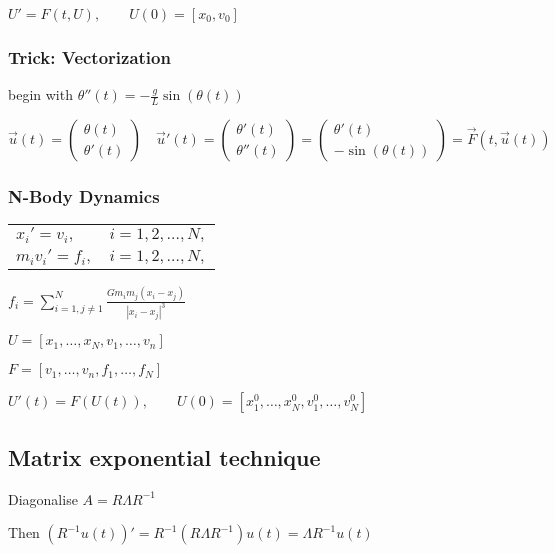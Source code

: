 \documentclass[10pt,a4paper]{scrartcl}
\begin{document}
\begin{multicols*}{3}
\begin{center}
$U'=F(t,U),\qquad U(0)=[x_0,v_0]$
\end{center}

\subsubsection{Trick: Vectorization}

begin with $\theta''(t)=-\frac{g}{L}\sin(\theta(t))$

\small
$\vec{u}(t)=\begin{pmatrix}\theta(t)\\\theta'(t)\end{pmatrix}\quad\vec{u}'(t)=\begin{pmatrix}\theta'(t)\\\theta''(t)\end{pmatrix}=\begin{pmatrix}\theta'(t)\\-\sin(\theta(t))\end{pmatrix}=\vec{F}(t,\vec{u}(t))$\normalsize

\subsubsection{N-Body Dynamics}

\begin{tabular}{ll}
$x_i'=v_i,$&$i=1,2,\ldots,N,$\\
$m_iv_i'=f_i,$&$i=1,2,\ldots,N,$
\end{tabular}

$f_i=\sum\limits_{i=1,j\neq 1}^N\frac{Gm_im_j(x_i-x_j)}{\left|x_i-x_j\right|^3}\qquad$ 

\begin{center}
$U=[x_1,\ldots,x_N,v_1,\ldots,v_n]$

$F=[v_1,\ldots,v_n,f_1,\ldots,f_N]$

$U'(t)=F(U(t)),\qquad U(0)=[x_1^0,\ldots,x_N^0,v_1^0,\ldots,v_N^0]$
\end{center}

\subsection{Matrix exponential technique}


Diagonalise $A=R\Lambda R^{-1}$

Then $(R^{-1}u(t))'=R^{-1}(R\Lambda R^{-1})u(t)=\Lambda R^{-1}u(t)$


\end{multicols*}
\end{document}
